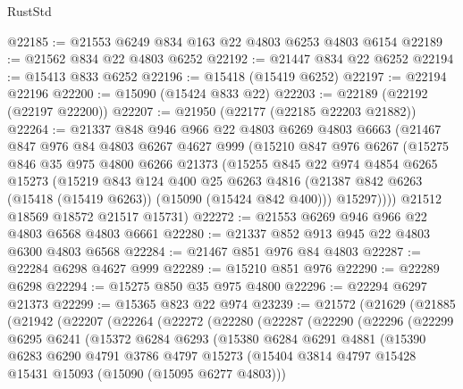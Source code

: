 \begin{lexlean}{RustStd}
\begin{coremodule}
@22185 := @21553 @6249 @834 @163 @22 @4803 @6253 @4803 @6154
@22189 := @21562 @834 @22 @4803 @6252
@22192 := @21447 @834 @22 @6252
@22194 := @15413 @833 @6252
@22196 := @15418 (@15419 @6252)
@22197 := @22194 @22196
@22200 := @15090 (@15424 @833 @22)
@22203 := @22189 (@22192 (@22197 @22200))
@22207 := @21950 (@22177 (@22185 @22203 @21882))
@22264 := @21337
    @848
    @946
    @966
    @22
    @4803
    @6269
    @4803
    @6663
    (@21467
      @847
      @976
      @84
      @4803
      @6267
      @4627
      @999
      (@15210
        @847
        @976
        @6267
        (@15275
          @846
          @35
          @975
          @4800
          @6266
          @21373
          (@15255
            @845
            @22
            @974
            @4854
            @6265
            @15273
            (@15219
              @843
              @124
              @400
              @25
              @6263
              @4816
              (@21387 @842 @6263 (@15418 (@15419 @6263)) (@15090 (@15424 @842 @400)))
              @15297))))
      @21512
      @18569
      @18572
      @21517
      @15731)
@22272 := @21553 @6269 @946 @966 @22 @4803 @6568 @4803 @6661
@22280 := @21337 @852 @913 @945 @22 @4803 @6300 @4803 @6568
@22284 := @21467 @851 @976 @84 @4803
@22287 := @22284 @6298 @4627 @999
@22289 := @15210 @851 @976
@22290 := @22289 @6298
@22294 := @15275 @850 @35 @975 @4800
@22296 := @22294 @6297 @21373
@22299 := @15365 @823 @22 @974
@23239 := @21572
    (@21629
      (@21885
        (@21942
          (@22207
            (@22264
              (@22272
                (@22280
                  (@22287
                    (@22290
                      (@22296
                        (@22299
                          @6295
                          @6241
                          (@15372
                            @6284
                            @6293
                            (@15380
                              @6284
                              @6291
                              @4881
                              (@15390
                                @6283
                                @6290
                                @4791
                                @3786
                                @4797
                                @15273
                                (@15404
                                  @3814
                                  @4797
                                  @15428
                                  @15431
                                  @15093
                                  (@15090 (@15095 @6277 @4803)))

\end{coremodule}
\end{lexlean}
